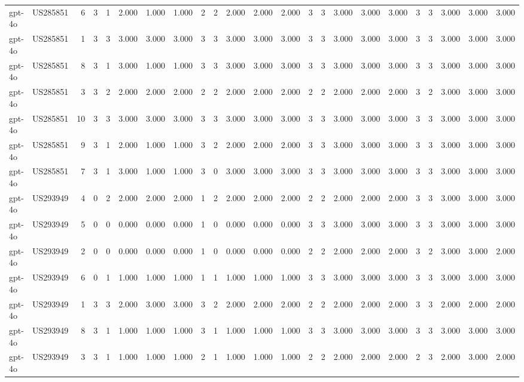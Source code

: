 \begin{table}
\begin{tabular}{llrrrrrrrrrrrrrrrrrrrrr}
gpt-4o & US285851 & 6 & 3 & 1 & 2.000 & 1.000 & 1.000 & 2 & 2 & 2.000 & 2.000 & 2.000 & 3 & 3 & 3.000 & 3.000 & 3.000 & 3 & 3 & 3.000 & 3.000 & 3.000 \\
gpt-4o & US285851 & 1 & 3 & 3 & 3.000 & 3.000 & 3.000 & 3 & 3 & 3.000 & 3.000 & 3.000 & 3 & 3 & 3.000 & 3.000 & 3.000 & 3 & 3 & 3.000 & 3.000 & 3.000 \\
gpt-4o & US285851 & 8 & 3 & 1 & 3.000 & 1.000 & 1.000 & 3 & 3 & 3.000 & 3.000 & 3.000 & 3 & 3 & 3.000 & 3.000 & 3.000 & 3 & 3 & 3.000 & 3.000 & 3.000 \\
gpt-4o & US285851 & 3 & 3 & 2 & 2.000 & 2.000 & 2.000 & 2 & 2 & 2.000 & 2.000 & 2.000 & 2 & 2 & 2.000 & 2.000 & 2.000 & 3 & 2 & 3.000 & 3.000 & 3.000 \\
gpt-4o & US285851 & 10 & 3 & 3 & 3.000 & 3.000 & 3.000 & 3 & 3 & 3.000 & 3.000 & 3.000 & 3 & 3 & 3.000 & 3.000 & 3.000 & 3 & 3 & 3.000 & 3.000 & 3.000 \\
gpt-4o & US285851 & 9 & 3 & 1 & 2.000 & 1.000 & 1.000 & 3 & 2 & 2.000 & 2.000 & 2.000 & 3 & 3 & 3.000 & 3.000 & 3.000 & 3 & 3 & 3.000 & 3.000 & 3.000 \\
gpt-4o & US285851 & 7 & 3 & 1 & 3.000 & 1.000 & 1.000 & 3 & 0 & 3.000 & 3.000 & 3.000 & 3 & 3 & 3.000 & 3.000 & 3.000 & 3 & 3 & 3.000 & 3.000 & 3.000 \\
gpt-4o & US293949 & 4 & 0 & 2 & 2.000 & 2.000 & 2.000 & 1 & 2 & 2.000 & 2.000 & 2.000 & 2 & 2 & 2.000 & 2.000 & 2.000 & 3 & 3 & 3.000 & 3.000 & 3.000 \\
gpt-4o & US293949 & 5 & 0 & 0 & 0.000 & 0.000 & 0.000 & 1 & 0 & 0.000 & 0.000 & 0.000 & 3 & 3 & 3.000 & 3.000 & 3.000 & 3 & 3 & 3.000 & 3.000 & 3.000 \\
gpt-4o & US293949 & 2 & 0 & 0 & 0.000 & 0.000 & 0.000 & 1 & 0 & 0.000 & 0.000 & 0.000 & 2 & 2 & 2.000 & 2.000 & 2.000 & 3 & 2 & 3.000 & 3.000 & 2.000 \\
gpt-4o & US293949 & 6 & 0 & 1 & 1.000 & 1.000 & 1.000 & 1 & 1 & 1.000 & 1.000 & 1.000 & 3 & 3 & 3.000 & 3.000 & 3.000 & 3 & 3 & 3.000 & 3.000 & 3.000 \\
gpt-4o & US293949 & 1 & 3 & 3 & 2.000 & 3.000 & 3.000 & 3 & 2 & 2.000 & 2.000 & 2.000 & 2 & 2 & 2.000 & 2.000 & 2.000 & 3 & 3 & 2.000 & 2.000 & 2.000 \\
gpt-4o & US293949 & 8 & 3 & 1 & 1.000 & 1.000 & 1.000 & 3 & 1 & 1.000 & 1.000 & 1.000 & 3 & 3 & 3.000 & 3.000 & 3.000 & 3 & 3 & 3.000 & 3.000 & 3.000 \\
gpt-4o & US293949 & 3 & 3 & 1 & 1.000 & 1.000 & 1.000 & 2 & 1 & 1.000 & 1.000 & 1.000 & 2 & 2 & 2.000 & 2.000 & 2.000 & 2 & 3 & 2.000 & 3.000 & 2.000 \\

\end{tabular}
\end{table}
